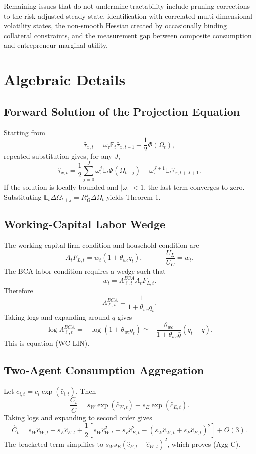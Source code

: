 \documentclass[11pt]{article}
\newcommand{\E}{\mathbb{E}}
\theoremstyle{plain}
\theoremstyle{definition}
\begin{document}
Remaining issues that do not undermine tractability include pruning corrections
to the risk-adjusted steady state, identification with correlated
multi-dimensional volatility states, the non-smooth Hessian created by
occasionally binding collateral constraints, and the measurement gap between
composite consumption and entrepreneur marginal utility.

\appendix

\section{Algebraic Details}

\subsection{Forward Solution of the Projection Equation}

Starting from
\[
\hat\tau_{x,t}
=
\omega_\tau\E_t\hat\tau_{x,t+1}
+\frac{1}{2}\Phi(\Omega_t),
\]
repeated substitution gives, for any $J$,
\[
\hat\tau_{x,t}
=
\frac{1}{2}\sum_{j=0}^{J}\omega_\tau^j\E_t\Phi(\Omega_{t+j})
+\omega_\tau^{J+1}\E_t\hat\tau_{x,t+J+1}.
\]
If the solution is locally bounded and $|\omega_\tau|<1$, the last term
converges to zero. Substituting
$\E_t\Delta\Omega_{t+j}=R_\Omega^j\Delta\Omega_t$ yields Theorem 1.

\subsection{Working-Capital Labor Wedge}

The working-capital firm condition and household condition are
\[
A_tF_{L,t}=w_t(1+\theta_{wc}q_t),
\qquad
-\frac{U_L}{U_C}=w_t.
\]
The BCA labor condition requires a wedge such that
\[
w_t=\Lambda_{\ell,t}^{BCA}A_tF_{L,t}.
\]
Therefore
\[
\Lambda_{\ell,t}^{BCA}
=
\frac{1}{1+\theta_{wc}q_t}.
\]
Taking logs and expanding around $\bar q$ gives
\[
\log\Lambda_{\ell,t}^{BCA}
=
-\log(1+\theta_{wc}q_t)
\simeq
-\frac{\theta_{wc}}{1+\theta_{wc}\bar q}(q_t-\bar q).
\]
This is equation (WC-LIN).

\subsection{Two-Agent Consumption Aggregation}

Let $c_{i,t}=\bar c_i\exp(\hat c_{i,t})$. Then
\[
\frac{C_t}{\bar C}
=
s_W\exp(\hat c_{W,t})+s_E\exp(\hat c_{E,t}).
\]
Taking logs and expanding to second order gives
\[
\hat C_t
=
s_W\hat c_{W,t}+s_E\hat c_{E,t}
+\frac{1}{2}
\left[
s_W\hat c_{W,t}^2+s_E\hat c_{E,t}^2
-(s_W\hat c_{W,t}+s_E\hat c_{E,t})^2
\right]
+O(3).
\]
The bracketed term simplifies to
$s_Ws_E(\hat c_{E,t}-\hat c_{W,t})^2$, which proves (Agg-C).
\end{document}
